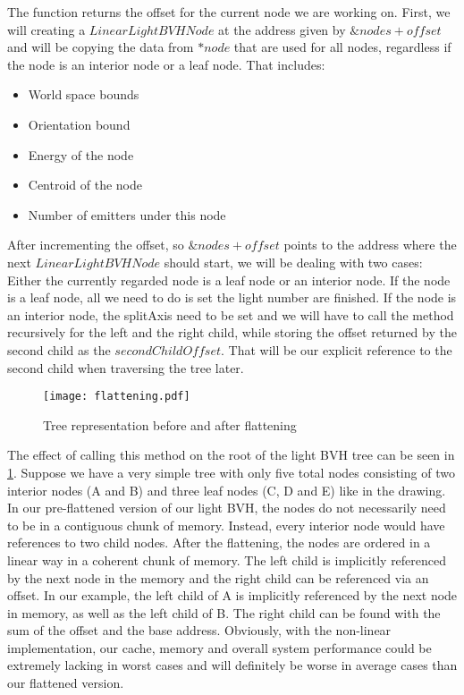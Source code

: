 The function returns the offset for the current node we are working on. First, we will creating a $LinearLightBVHNode$ at the address given by $\&nodes + offset$ and will be copying the data from $*node$ that are used for all nodes, regardless if the node is an interior node or a leaf node. That includes:

\begin{itemize}
	\item World space bounds
	\item Orientation bound
	\item Energy of the node
	\item Centroid of the node
	\item Number of emitters under this node
\end{itemize} 

After incrementing the offset, so $\&nodes + offset$ points to the address where the next $LinearLightBVHNode$ should start, we will be dealing with two cases: Either the currently regarded node is a leaf node or an interior node. If the node is a leaf node, all we need to do is set the light number are finished. If the node is an interior node, the splitAxis need to be set and we will have to call the method recursively for the left and the right child, while storing the offset returned by the second child as the $secondChildOffset$. That will be our explicit reference to the second child when traversing the tree later.

\begin{figure}
	\begin{center}
		\texttt{[image: flattening.pdf]}
		\caption{Tree representation before and after flattening}
		\label{fig:flattening}
	\end{center}
\end{figure}

The effect of calling this method on the root of the light BVH tree can be seen in \ref{fig:flattening}. Suppose we have a very simple tree with only five total nodes consisting of two interior nodes (A and B) and three leaf nodes (C, D and E) like in the drawing. In our pre-flattened version of our light BVH, the nodes do not necessarily need to be in a contiguous chunk of memory. Instead, every interior node would have references to two child nodes. After the flattening, the nodes are ordered in a linear way in a coherent chunk of memory. The left child is implicitly referenced by the next node in the memory and the right child can be referenced via an offset. In our example, the left child of A is implicitly referenced by the next node in memory, as well as the left child of B. The right child can be found with the sum of the offset and the base address. Obviously, with the non-linear implementation, our cache, memory and overall system performance could be extremely lacking in worst cases and will definitely be worse in average cases than our flattened version.

